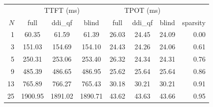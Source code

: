 \begin{tabular}{rccccccr}
\toprule
 & \multicolumn{3}{c}{TTFT (ms)} & \multicolumn{3}{c}{TPOT (ms)} & \\
$N$ & full & ddi\_qf & blind & full & ddi\_qf & blind & sparsity \\
\midrule
1 & 60.35 & 61.59 & 61.39 & 26.03 & 24.45 & 24.09 & 0.00 \\
3 & 151.03 & 154.69 & 154.10 & 24.43 & 24.26 & 24.06 & 0.61 \\
5 & 250.31 & 253.06 & 253.40 & 26.32 & 24.34 & 24.31 & 0.76 \\
9 & 485.39 & 486.65 & 486.95 & 25.62 & 25.64 & 25.64 & 0.86 \\
13 & 765.89 & 766.27 & 765.43 & 30.18 & 30.21 & 30.21 & 0.91 \\
25 & 1900.95 & 1891.02 & 1890.71 & 43.62 & 43.63 & 43.66 & 0.95 \\
\bottomrule
\end{tabular}
